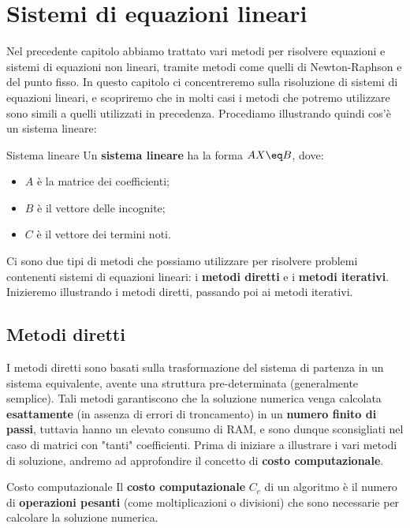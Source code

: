 \chapter{Sistemi di equazioni lineari}

Nel precedente capitolo abbiamo trattato vari metodi per risolvere equazioni e sistemi di equazioni non lineari, tramite metodi come quelli di Newton-Raphson e del punto fisso. In questo capitolo ci concentreremo sulla risoluzione di sistemi di equazioni lineari, e scopriremo che in molti casi i metodi che potremo utilizzare sono simili a quelli utilizzati in precedenza. Procediamo illustrando quindi cos'è un sistema lineare:

\begin{definition}{Sistema lineare}
    Un \textbf{sistema lineare} ha la forma $AX \eq B$, dove:
    \begin{itemize}
        \item $A$ è la matrice dei coefficienti;
        \item $B$ è il vettore delle incognite;
        \item $C$ è il vettore dei termini noti.
    \end{itemize}
\end{definition}

Ci sono due tipi di metodi che possiamo utilizzare per risolvere problemi contenenti sistemi di equazioni lineari: i \textbf{metodi diretti} e i \textbf{metodi iterativi}. Inizieremo illustrando i metodi diretti, passando poi ai metodi iterativi.

\section{Metodi diretti}

I metodi diretti sono basati sulla trasformazione del sistema di partenza in un sistema equivalente, avente una struttura pre-determinata (generalmente semplice). Tali metodi garantiscono che la soluzione numerica venga calcolata \textbf{esattamente} (in assenza di errori di troncamento) in un \textbf{numero finito di passi}, tuttavia hanno un elevato consumo di RAM, e sono dunque sconsigliati nel caso di matrici con "tanti" coefficienti.
\nwl
Prima di iniziare a illustrare i vari metodi di soluzione, andremo ad approfondire il concetto di \textbf{costo computazionale}. 

\begin{definition}{Costo computazionale}
    Il \textbf{costo computazionale} $C_c$ di un algoritmo è il numero di \textbf{operazioni pesanti} (come moltiplicazioni o divisioni) che sono necessarie per calcolare la soluzione numerica.
\end{definition}

